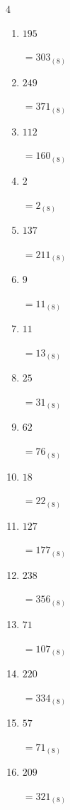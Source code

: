 \begin{multicols}{4}
\begin{enumerate}
        $=40_{(8)}$

  \item $195$

        $=303_{(8)}$

  \item $249$

        $=371_{(8)}$

\columnbreak %

  \item $112$

        $=160_{(8)}$

  \item $2$

        $=2_{(8)}$

  \item $137$

        $=211_{(8)}$

  \item $9$

        $=11_{(8)}$

  \item $11$

        $=13_{(8)}$

  \item $25$

        $=31_{(8)}$

  \item $62$

        $=76_{(8)}$

  \item $18$

        $=22_{(8)}$

  \item $127$

        $=177_{(8)}$

  \item $238$

        $=356_{(8)}$

  \item $71$

        $=107_{(8)}$

  \item $220$

        $=334_{(8)}$

  \item $57$

        $=71_{(8)}$

  \item $209$

        $=321_{(8)}$


\end{enumerate}
\end{multicols}
